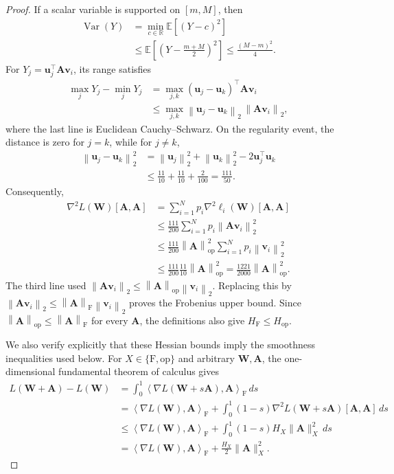 \documentclass[11pt]{article}
\theoremstyle{definition}
\newcommand{\ub}{\mathbf{u}}
\newcommand{\vb}{\mathbf{v}}
\newcommand{\Ab}{\mathbf{A}}
\newcommand{\Wb}{\mathbf{W}}
\newcommand{\EE}{\mathbb{E}}
\newcommand{\RR}{\mathbb{R}}
\newcommand{\norm}[1]{\left\lVert #1\right\rVert_2}
\newcommand{\normF}[1]{\left\lVert #1\right\rVert_{\mathrm F}}
\newcommand{\normop}[1]{\left\lVert #1\right\rVert_{\mathrm{op}}}
\newcommand{\HF}{H_{\mathrm F}}
\newcommand{\Hop}{H_{\mathrm{op}}}
\begin{document}
\begin{proof}
If a scalar variable is supported on $[m,M]$, then
\begin{align*}
 \operatorname{Var}(Y)
 &=\min_{c\in\RR}\EE[(Y-c)^2]\\
 &\leq\EE\!\left[\left(Y-\frac{m+M}{2}\right)^2\right]
 \leq\frac{(M-m)^2}{4}.
\end{align*}
For $Y_j=\ub_j^\top\Ab\vb_i$, its range satisfies
\begin{align*}
 \max_jY_j-\min_jY_j
 &=\max_{j,k}(\ub_j-\ub_k)^\top\Ab\vb_i\\
 &\leq
 \max_{j,k}\norm{\ub_j-\ub_k}\,\norm{\Ab\vb_i},
\end{align*}
where the last line is Euclidean Cauchy--Schwarz.  On the regularity event,
the distance is zero for $j=k$, while for $j\ne k$,
\begin{align*}
 \norm{\ub_j-\ub_k}^2
 &=\norm{\ub_j}^2+\norm{\ub_k}^2-2\ub_j^\top\ub_k\\
 &\leq\frac{11}{10}+\frac{11}{10}+\frac2{100}
 =\frac{111}{50}.
\end{align*}
Consequently,
\begin{align*}
 \nabla^2L(\Wb)[\Ab,\Ab]
 &=\sum_{i=1}^Np_i\nabla^2\ell_i(\Wb)[\Ab,\Ab]\\
 &\leq\frac{111}{200}
 \sum_{i=1}^Np_i\norm{\Ab\vb_i}^2\\
 &\leq\frac{111}{200}\normop{\Ab}^2
 \sum_{i=1}^Np_i\norm{\vb_i}^2\\
 &\leq\frac{111}{200}\frac{11}{10}\normop{\Ab}^2
 =\frac{1221}{2000}\normop{\Ab}^2.
\end{align*}
The third line used
$\norm{\Ab\vb_i}\leq\normop{\Ab}\norm{\vb_i}$.  Replacing this by
$\norm{\Ab\vb_i}\leq\normF{\Ab}\norm{\vb_i}$ proves the Frobenius
upper bound.  Since $\normop{\Ab}\leq\normF{\Ab}$ for every $\Ab$, the
definitions also give $\HF\leq\Hop$.

We also verify explicitly that these Hessian bounds imply the smoothness
inequalities used below.  For $X\in\{\mathrm F,\mathrm{op}\}$ and arbitrary
$\Wb,\Ab$, the one-dimensional fundamental theorem of calculus gives
\begin{align*}
 L(\Wb+\Ab)-L(\Wb)
 &=\int_0^1
 \left\langle\nabla L(\Wb+s\Ab),\Ab\right\rangle_{\mathrm F}\,ds\\
 &=\left\langle\nabla L(\Wb),\Ab\right\rangle_{\mathrm F}
 +\int_0^1(1-s)\nabla^2L(\Wb+s\Ab)[\Ab,\Ab]\,ds\\
 &\leq\left\langle\nabla L(\Wb),\Ab\right\rangle_{\mathrm F}
 +\int_0^1(1-s)H_X\|\Ab\|_X^2\,ds\\
 &=\left\langle\nabla L(\Wb),\Ab\right\rangle_{\mathrm F}
 +\frac{H_X}{2}\|\Ab\|_X^2.
\end{align*}


\end{proof}
\end{document}
